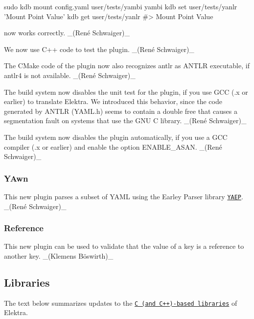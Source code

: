 \begin{DoxyCode}
sudo kdb mount config.yaml user/tests/yambi yambi
kdb set user/tests/yanlr 'Mount Point Value'
kdb get user/tests/yanlr
#> Mount Point Value
\end{DoxyCode}


now works correctly. \+\_\+(René Schwaiger)\+\_\+


\begin{DoxyItemize}
\item We now use C++ code to test the plugin. \+\_\+(René Schwaiger)\+\_\+
\item The C\+Make code of the plugin now also recognizes {\ttfamily antlr} as A\+N\+T\+LR executable, if {\ttfamily antlr4} is not available. \+\_\+(René Schwaiger)\+\_\+
\item The build system now disables the unit test for the plugin, if you use G\+CC ({.\+x} or earlier) to translate Elektra. We introduced this behavior, since the code generated by A\+N\+T\+LR ({\ttfamily Y\+A\+M\+L.\+h}) seems to contain a double free that causes a segmentation fault on systems that use the G\+NU C library. \+\_\+(René Schwaiger)\+\_\+
\item The build system now disables the plugin automatically, if you use a G\+CC compiler ({.\+x} or earlier) and enable the option {\ttfamily E\+N\+A\+B\+L\+E\+\_\+\+A\+S\+AN}. \+\_\+(René Schwaiger)\+\_\+
\end{DoxyItemize}

\subsubsection*{Y\+Awn}

This new plugin parses a subset of Y\+A\+ML using the Earley Parser library \href{https://github.com/vnmakarov/yaep}{\tt Y\+A\+EP}. \+\_\+(René Schwaiger)\+\_\+

\subsubsection*{Reference}

This new plugin can be used to validate that the value of a key is a reference to another key. \+\_\+(Klemens Böswirth)\+\_\+

\subsection*{Libraries}

The text below summarizes updates to the \href{https://www.libelektra.org/libraries/readme}{\tt C (and C++)-\/based libraries} of Elektra.

